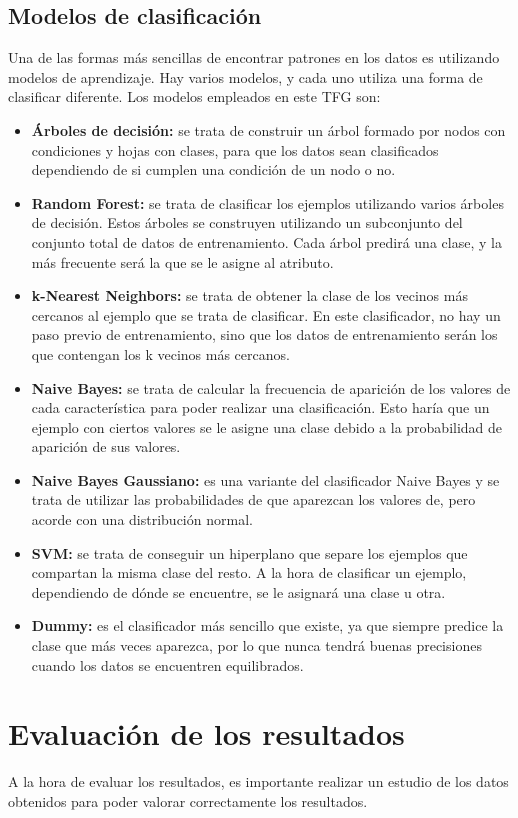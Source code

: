 \subsection{Modelos de clasificación}
Una de las formas más sencillas de encontrar patrones en los datos es utilizando modelos de aprendizaje. Hay varios modelos, y cada uno utiliza una forma de clasificar diferente. Los modelos empleados en este TFG son:
\begin{itemize}
	\item \textbf{Árboles de decisión:} se trata de construir un árbol formado por nodos con condiciones y hojas con clases, para que los datos sean clasificados dependiendo de si cumplen una condición de un nodo o no.
	\item \textbf{Random Forest:} se trata de clasificar los ejemplos utilizando varios árboles de decisión. Estos árboles se construyen utilizando un subconjunto del conjunto total de datos de entrenamiento. Cada árbol predirá una clase, y la más frecuente será la que se le asigne al atributo.
	\item \textbf{k-Nearest Neighbors:} se trata de obtener la clase de los vecinos más cercanos al ejemplo que se trata de clasificar. En este clasificador, no hay un paso previo de entrenamiento, sino que los datos de entrenamiento serán los que contengan los k vecinos más cercanos.
	\item \textbf{Naive Bayes:} se trata de calcular la frecuencia de aparición de los valores de cada característica para poder realizar una clasificación. Esto haría que 
	un ejemplo con ciertos valores se le asigne una clase debido a la probabilidad de aparición de sus valores.
	\item \textbf{Naive Bayes Gaussiano:} es una variante del clasificador Naive Bayes y se trata de utilizar las probabilidades de que aparezcan los valores de, pero acorde con una distribución normal.
	\item \textbf{SVM:} se trata de conseguir un hiperplano que separe los ejemplos que compartan la misma clase del resto. A la hora de clasificar un ejemplo, dependiendo de dónde se encuentre, se le asignará una clase u otra.
	\item \textbf{Dummy:} es el clasificador más sencillo que existe, ya que siempre predice la clase que más veces aparezca, por lo que nunca tendrá buenas precisiones cuando los datos se encuentren equilibrados.
\end{itemize}

\section{Evaluación de los resultados}
A la hora de evaluar los resultados, es importante realizar un estudio de los datos obtenidos para poder valorar correctamente los resultados.

